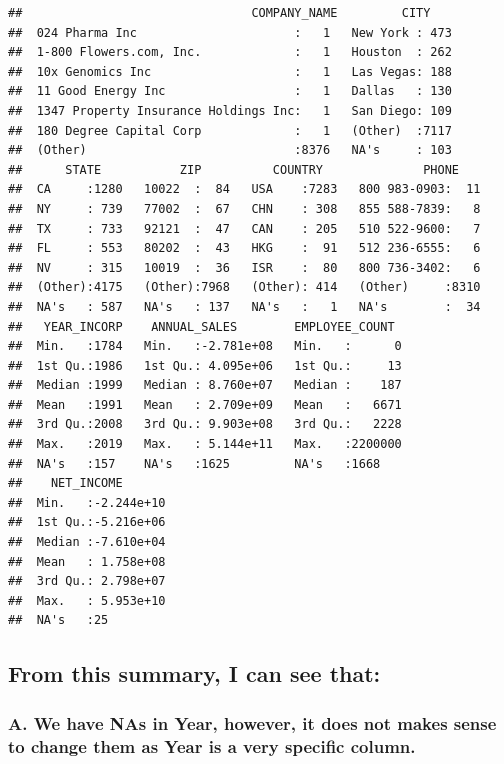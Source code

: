 \documentclass[]{article}
\begin{document}
\begin{verbatim}
##                                COMPANY_NAME         CITY     
##  024 Pharma Inc                      :   1   New York : 473  
##  1-800 Flowers.com, Inc.             :   1   Houston  : 262  
##  10x Genomics Inc                    :   1   Las Vegas: 188  
##  11 Good Energy Inc                  :   1   Dallas   : 130  
##  1347 Property Insurance Holdings Inc:   1   San Diego: 109  
##  180 Degree Capital Corp             :   1   (Other)  :7117  
##  (Other)                             :8376   NA's     : 103  
##      STATE           ZIP          COUNTRY              PHONE     
##  CA     :1280   10022  :  84   USA    :7283   800 983-0903:  11  
##  NY     : 739   77002  :  67   CHN    : 308   855 588-7839:   8  
##  TX     : 733   92121  :  47   CAN    : 205   510 522-9600:   7  
##  FL     : 553   80202  :  43   HKG    :  91   512 236-6555:   6  
##  NV     : 315   10019  :  36   ISR    :  80   800 736-3402:   6  
##  (Other):4175   (Other):7968   (Other): 414   (Other)     :8310  
##  NA's   : 587   NA's   : 137   NA's   :   1   NA's        :  34  
##   YEAR_INCORP    ANNUAL_SALES        EMPLOYEE_COUNT   
##  Min.   :1784   Min.   :-2.781e+08   Min.   :      0  
##  1st Qu.:1986   1st Qu.: 4.095e+06   1st Qu.:     13  
##  Median :1999   Median : 8.760e+07   Median :    187  
##  Mean   :1991   Mean   : 2.709e+09   Mean   :   6671  
##  3rd Qu.:2008   3rd Qu.: 9.903e+08   3rd Qu.:   2228  
##  Max.   :2019   Max.   : 5.144e+11   Max.   :2200000  
##  NA's   :157    NA's   :1625         NA's   :1668     
##    NET_INCOME        
##  Min.   :-2.244e+10  
##  1st Qu.:-5.216e+06  
##  Median :-7.610e+04  
##  Mean   : 1.758e+08  
##  3rd Qu.: 2.798e+07  
##  Max.   : 5.953e+10  
##  NA's   :25
\end{verbatim}

\hypertarget{from-this-summary-i-can-see-that}{%
\subsection{From this summary, I can see
that:}\label{from-this-summary-i-can-see-that}}

\hypertarget{a.-we-have-nas-in-year-however-it-does-not-makes-sense-to-change-them-as-year-is-a-very-specific-column.}{%
\subsubsection{A. We have NAs in Year, however, it does not makes sense
to change them as Year is a very specific
column.}\label{a.-we-have-nas-in-year-however-it-does-not-makes-sense-to-change-them-as-year-is-a-very-specific-column.}}
\end{document}
